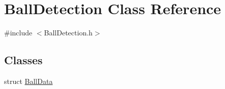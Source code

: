 \hypertarget{classBallDetection}{\section{\-Ball\-Detection \-Class \-Reference}
\label{classBallDetection}
}


{\ttfamily \#include $<$\-Ball\-Detection.\-h$>$}

\subsection*{\-Classes}
\begin{DoxyCompactItemize}
\item 
struct \hyperlink{structBallDetection_1_1BallData}{\-Ball\-Data}
\end{DoxyCompactItemize}
